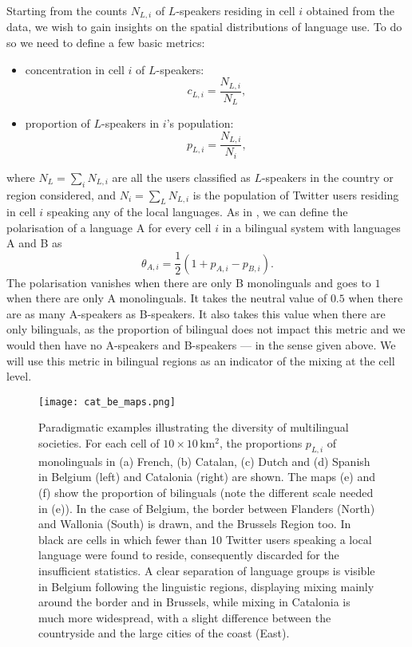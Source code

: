 \documentclass[../thesis.tex]{subfiles}
\begin{document}
Starting from the counts $N_{L,i}$ of $L$-speakers residing in cell $i$ obtained from
the data, we wish to gain insights on the spatial distributions of language use. To do
so we need to define a few basic metrics:
\begin{itemize}
  \item concentration in cell $i$ of $L$-speakers:
    \begin{equation}
    \label{eq:def_conc}
          c_{L,i} = \frac{N_{L,i}}{N_L},
    \end{equation}
  \item proportion of $L$-speakers in $i$'s population:
    \begin{equation}
    \label{eq:def_prop}
          p_{L,i} = \frac{N_{L,i}}{N_i},
    \end{equation}
\end{itemize}
where $N_L = \sum_i N_{L, i}$ are all the users classified as $L$-speakers in the country or region
considered, and $N_i = \sum_L N_{L, i}$ is the population of Twitter users residing in cell $i$ speaking
any of the local languages. As in \cite{MocanuTwitterBabel2013}, we can define the
polarisation of a language A for every cell $i$ in a bilingual system with languages A
and B as 
\begin{equation}
\label{eq:def_polar}
  \theta_{A, i} = \frac{1}{2} (1 + p_{A,i} - p_{B,i}). 
\end{equation}
The polarisation vanishes when there are only B monolinguals and goes to $1$ when there
are only A monolinguals. It takes the neutral value of $0.5$ when there are as many
A-speakers as B-speakers. It also takes this value when there are only bilinguals, as
the proportion of bilingual does not impact this metric and we would then have no
A-speakers and B-speakers --- in the sense given above. We will use this metric in
bilingual regions as an indicator of the mixing at the cell level. 

\begin{figure*}[p!]
  \centering
  \texttt{[image: cat\_be\_maps.png]}
  \caption{Paradigmatic examples illustrating the diversity of multilingual societies.
  For each cell of $10 \times 10 \, \si{\kilo \meter \squared}$, the proportions
  $p_{L,i}$ of monolinguals in (a) French, (b) Catalan, (c) Dutch and (d) Spanish in
  Belgium (left) and Catalonia (right) are shown. The maps (e) and (f) show the
  proportion of bilinguals (note the different scale needed in (e)). In the case of
  Belgium, the border between Flanders (North) and Wallonia (South) is drawn, and the
  Brussels Region too. In black are cells in which fewer than 10 Twitter users speaking
  a local language were found to reside, consequently discarded for the insufficient
  statistics. A clear separation of language groups is visible in Belgium following the
  linguistic regions, displaying mixing mainly around the border and in Brussels, while
  mixing in Catalonia is much more widespread, with a slight difference between the
  countryside and the large cities of the coast (East).}
  \label{fig:cat_be_maps}
\end{figure*}
\end{document}
